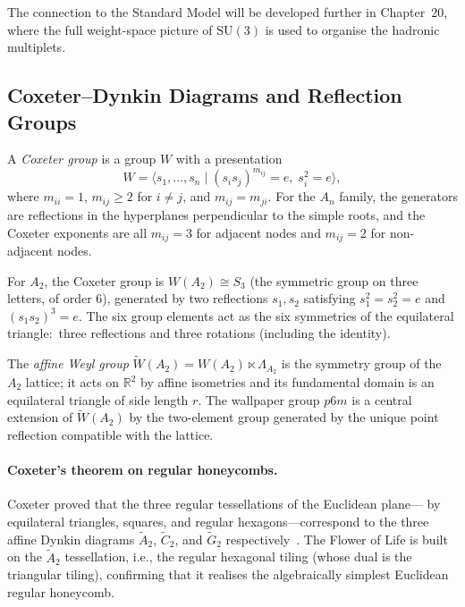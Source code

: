 The connection to the Standard Model will be developed further in
Chapter~20, where the full weight-space picture of \(\mathrm{SU}(3)\)
is used to organise the hadronic multiplets.

\subsection{Coxeter--Dynkin Diagrams and Reflection Groups}
\label{subsec:fol-coxeter}

A \emph{Coxeter group} is a group \(W\) with a presentation
\[
  W = \langle s_1,\ldots,s_n \mid
      (s_i s_j)^{m_{ij}} = e,\; s_i^2=e \rangle,
\]
where \(m_{ii}=1\), \(m_{ij}\ge 2\) for \(i\ne j\), and \(m_{ij}=m_{ji}\).
For the \(A_n\) family, the generators are reflections in the hyperplanes
perpendicular to the simple roots, and the Coxeter exponents are all
\(m_{ij}=3\) for adjacent nodes and \(m_{ij}=2\) for non-adjacent nodes.

For \(A_2\), the Coxeter group is \(W(A_2)\cong S_3\) (the symmetric
group on three letters, of order 6), generated by two reflections
\(s_1,s_2\) satisfying \(s_1^2=s_2^2=e\) and \((s_1 s_2)^3=e\).
The six group elements act as the six symmetries of the equilateral
triangle:\ three reflections and three rotations (including the identity).

The \emph{affine Weyl group} \(\tilde{W}(A_2) = W(A_2)\ltimes\Lambda_{A_2}\)
is the symmetry group of the \(A_2\) lattice; it acts on \(\mathbb{R}^2\)
by affine isometries and its fundamental domain is an equilateral triangle
of side length \(r\).  The wallpaper group \(p6m\) is a central extension
of \(\tilde{W}(A_2)\) by the two-element group generated by the unique
point reflection compatible with the lattice.

\paragraph{Coxeter's theorem on regular honeycombs.}
Coxeter proved that the three regular tessellations of the Euclidean plane—
by equilateral triangles, squares, and regular hexagons—correspond to the
three affine Dynkin diagrams \(\tilde{A}_2\), \(\tilde{C}_2\), and
\(\tilde{G}_2\) respectively~\cite{coxeter_intro_geometry}.
The Flower of Life is built on the \(\tilde{A}_2\) tessellation, i.e., the
regular hexagonal tiling (whose dual is the triangular tiling), confirming
that it realises the algebraically simplest Euclidean regular honeycomb.

